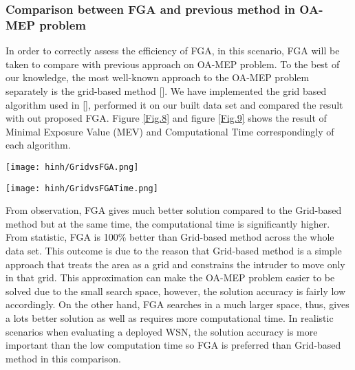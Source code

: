 \documentclass[final]{elsarticle}
\begin{document}
\subsubsection{Comparison between FGA and previous method in OA-MEP problem}
In order to correctly assess the efficiency of FGA, in this scenario, FGA will be taken to compare with previous approach on OA-MEP problem. To the best of our knowledge, the most well-known approach to the OA-MEP problem separately is the grid-based method []. We have implemented the grid based algorithm used in [], performed it on our built data set and compared the result with out proposed FGA. Figure \ref{Fig.8} and figure \ref{Fig.9} shows the result of Minimal Exposure Value (MEV) and Computational Time correspondingly of each algorithm.
\begin{figure*}[h]
	\texttt{[image: hinh/GridvsFGA.png]}
	\centering
	\caption{The Minimal Exposure Value comparison between FGA and Grid based method on some noble topologies
	}
	\label{Fig.8}       %
\end{figure*}
\begin{figure*}[h]
	\texttt{[image: hinh/GridvsFGATime.png]}
	\centering
	\caption{The Computational Time (sec) comparison between FGA and Grid based method on some noble topologies
	}
	\label{Fig.9}       %
\end{figure*}

From observation, FGA gives much better solution compared to the Grid-based method but at the same time, the computational time is significantly higher. From statistic, FGA is 100\% better than Grid-based method across the whole data set. This outcome is due to the reason that Grid-based method is a simple approach that treats the area as a grid and constrains the intruder to move only in that grid. This approximation can make the OA-MEP problem easier to be solved due to the small search space, however, the solution accuracy is fairly low accordingly. On the other hand, FGA searches in a much larger space, thus, gives a lots better solution as well as requires more computational time. In realistic scenarios when evaluating a deployed WSN, the solution accuracy is more important than the low computation time so FGA is preferred than Grid-based method in this comparison. 
\end{document}
